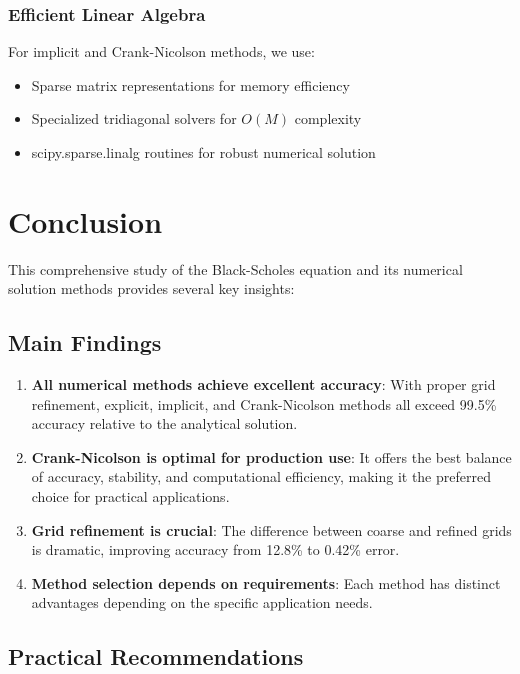 \documentclass[12pt,a4paper]{article}
\numberwithin{algorithm}{subsection}
\begin{document}
\subsubsection{Efficient Linear Algebra}

For implicit and Crank-Nicolson methods, we use:
\begin{itemize}
\item Sparse matrix representations for memory efficiency
\item Specialized tridiagonal solvers for $O(M)$ complexity
\item scipy.sparse.linalg routines for robust numerical solution
\end{itemize}

\section{Conclusion}

This comprehensive study of the Black-Scholes equation and its numerical solution methods provides several key insights:

\subsection{Main Findings}

\begin{enumerate}
\item \textbf{All numerical methods achieve excellent accuracy}: With proper grid refinement, explicit, implicit, and Crank-Nicolson methods all exceed 99.5\% accuracy relative to the analytical solution.

\item \textbf{Crank-Nicolson is optimal for production use}: It offers the best balance of accuracy, stability, and computational efficiency, making it the preferred choice for practical applications.

\item \textbf{Grid refinement is crucial}: The difference between coarse and refined grids is dramatic, improving accuracy from 12.8\% to 0.42\% error.

\item \textbf{Method selection depends on requirements}: Each method has distinct advantages depending on the specific application needs.
\end{enumerate}

\subsection{Practical Recommendations}
\end{document}
